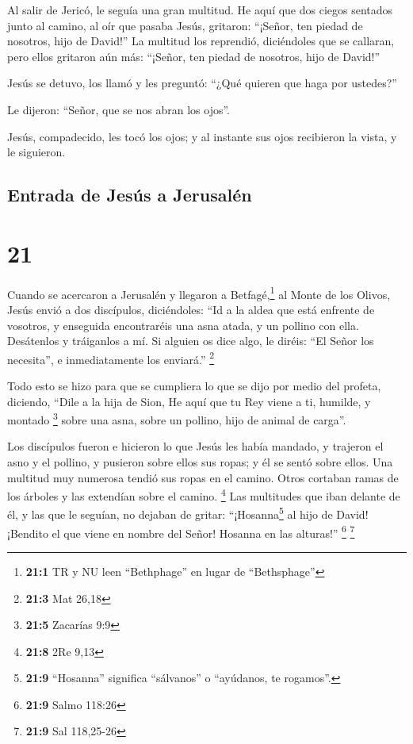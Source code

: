  Al salir de Jericó, le seguía una gran multitud.
 He aquí que dos ciegos sentados junto al camino, al oír
que pasaba Jesús, gritaron: ``¡Señor, ten piedad de nosotros, hijo de
David!''  La multitud los reprendió, diciéndoles que se
callaran, pero ellos gritaron aún más: ``¡Señor, ten piedad de nosotros,
hijo de David!''

 Jesús se detuvo, los llamó y les preguntó: ``¿Qué
quieren que haga por ustedes?''

 Le dijeron: ``Señor, que se nos abran los ojos''.

 Jesús, compadecido, les tocó los ojos; y al instante sus
ojos recibieron la vista, y le siguieron.

\hypertarget{entrada-de-jesuxfas-a-jerusaluxe9n}{%
\subsection{Entrada de Jesús a
Jerusalén}\label{entrada-de-jesuxfas-a-jerusaluxe9n}}

\hypertarget{section-20}{%
\section{21}\label{section-20}}

 Cuando se acercaron a Jerusalén y llegaron a
Betfagé,\footnote{\textbf{21:1} TR y NU leen ``Bethphage'' en lugar de
  ``Bethsphage''} al Monte de los Olivos, Jesús envió a dos discípulos,
 diciéndoles: ``Id a la aldea que está enfrente de
vosotros, y enseguida encontraréis una asna atada, y un pollino con
ella. Desátenlos y tráiganlos a mí.  Si alguien os dice
algo, le diréis: ``El Señor los necesita'', e inmediatamente los
enviará.'' \footnote{\textbf{21:3} Mat 26,18}

 Todo esto se hizo para que se cumpliera lo que se dijo
por medio del profeta, diciendo,  ``Dile a la hija de
Sion, He aquí que tu Rey viene a ti, humilde, y montado \footnote{\textbf{21:5}
  Zacarías 9:9} sobre una asna, sobre un pollino, hijo de animal de
carga''.

 Los discípulos fueron e hicieron lo que Jesús les había
mandado,  y trajeron el asno y el pollino, y pusieron
sobre ellos sus ropas; y él se sentó sobre ellos.  Una
multitud muy numerosa tendió sus ropas en el camino. Otros cortaban
ramas de los árboles y las extendían sobre el camino. \footnote{\textbf{21:8}
  2Re 9,13}  Las multitudes que iban delante de él, y las
que le seguían, no dejaban de gritar: ``¡Hosanna\footnote{\textbf{21:9}
  ``Hosanna'' significa ``sálvanos'' o ``ayúdanos, te rogamos''.} al
hijo de David! ¡Bendito el que viene en nombre del Señor! Hosanna en las
alturas!'' \footnote{\textbf{21:9} Salmo 118:26} \footnote{\textbf{21:9}
  Sal 118,25-26}

